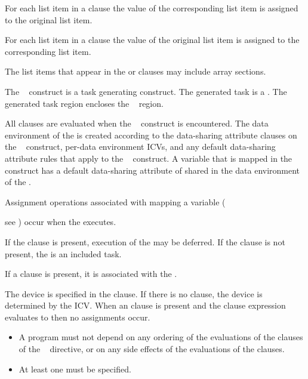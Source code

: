 {{{\begin{samepage}
For each list item in a  clause the value of the corresponding list item is assigned 
to the original list item.

For each list item in a  clause the value of the original list item is assigned to the 
corresponding list item.

\end{samepage}

The list items that appear in the  or  clauses may include array sections.

The ~ construct is a task generating construct.  The generated task is a .  The generated task region encloses the ~ region.

All clauses are evaluated when the ~ construct is encountered.  The data environment of the  is created according to the data-sharing attribute clauses on the ~ construct, per-data environment ICVs, and any default data-sharing attribute rules that apply to the ~ construct.  A variable that is mapped in the ~ construct has a default data-sharing attribute of shared in the data environment of the .

Assignment operations associated with mapping a variable ({see ) occur when the  executes.

If the  clause is present, execution of the  may be deferred.  If the  clause is not present, the  is an included task.

If a  clause is present, it is associated with the .

The device is specified in the  clause. If there is no  clause, the device 
is determined by the  ICV. When an  clause is present and the  
clause expression evaluates to  then no assignments occur.

\restrictions
\begin{itemize}
\item A program must not depend on any ordering of the evaluations of the clauses of the 
~ directive, or on any side effects of the evaluations of the clauses. 

\item At least one  must be specified.


\end{itemize}}}}}
